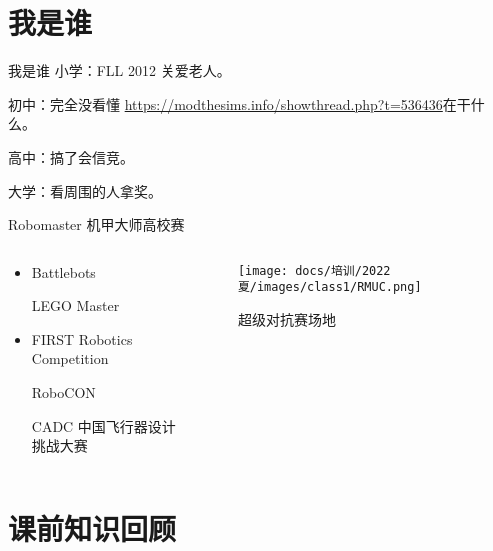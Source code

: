 
\section{我是谁}

\begin{frame}{我是谁}
    小学：FLL 2012 关爱老人。
    
    初中：完全没看懂 \url{https://modthesims.info/showthread.php?t=536436}在干什么。
    
    高中：搞了会信竞。
    
    大学：看周围的人拿奖。
\end{frame}

\begin{frame}{Robomaster 机甲大师高校赛}
    \begin{columns}
    \begin{column}{0.4\textwidth}
    \begin{itemize}
        \item {} Battlebots
        
         LEGO Master
        
        \item {} FIRST Robotics Competition
        
         RoboCON
        
         CADC 中国飞行器设计挑战大赛
    \end{itemize}
    \end{column}
    \begin{column}{0.7\textwidth}
    \begin{figure}
        \centering
        \texttt{[image: docs/培训/2022夏/images/class1/RMUC.png]}
        \caption{超级对抗赛场地}
        \label{fig:my_label}
    \end{figure}
    \end{column}
    \end{columns}
\end{frame}

\section{课前知识回顾}

